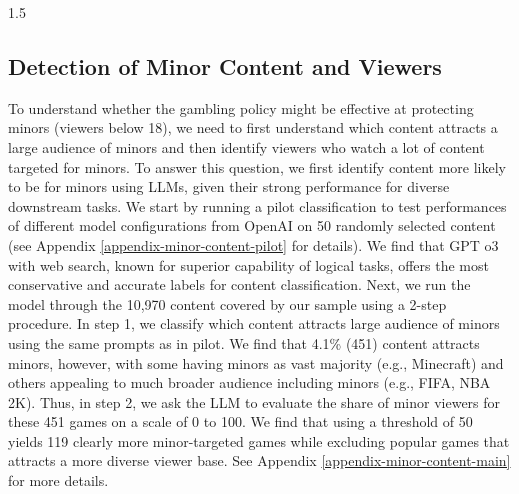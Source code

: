 \documentclass[a4paper,12pt]{article}
\begin{document}
\begin{spacing}{1.5}
\subsection{Detection of Minor Content and Viewers}
To understand whether the gambling policy might be effective at protecting minors (viewers below 18), we need to first understand which content attracts a large audience of minors and then identify viewers who watch a lot of content targeted for minors. To answer this question, we first identify content more likely to be for minors using LLMs, given their strong performance for diverse downstream tasks. We start by running a pilot classification to test performances of  different model configurations from OpenAI on 50 randomly selected content (see Appendix \ref{appendix-minor-content-pilot} for details). We find that GPT o3 with web search, known for superior capability of logical tasks, offers the most conservative and accurate labels for content classification. Next, we run the model through the 10,970 content covered by our sample using a 2-step procedure. In step 1, we classify which content attracts large audience of minors using the same prompts as in pilot. We find that 4.1\% (451) content attracts minors, however, with some having minors as vast majority (e.g., Minecraft) and others appealing to much broader audience including minors (e.g., FIFA, NBA 2K). Thus, in step 2, we ask the LLM to evaluate the share of minor viewers for these 451 games on a scale of 0 to 100. We find that using a threshold of 50 yields 119 clearly more minor-targeted games while excluding popular games that attracts a more diverse viewer base. See Appendix \ref{appendix-minor-content-main} for more details.  


\end{spacing}
\end{document}
